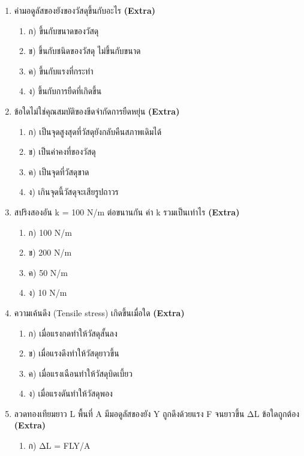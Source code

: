 \documentclass[12pt]{article}
\begin{document}
\begin{enumerate}[label=\arabic*.]
\begin{enumerate}[label=)]
\item ข) 2×10⁵ Pa
\item ค) 2×10⁷ Pa
\item ง) 2×10⁴ Pa
\end{enumerate}
\item ค่ามอดูลัสของยังของวัสดุขึ้นกับอะไร \hfill \textbf{\small (Extra)}
\begin{enumerate}[label=)]
\item ก) ขึ้นกับขนาดของวัสดุ
\item ข) ขึ้นกับชนิดของวัสดุ ไม่ขึ้นกับขนาด
\item ค) ขึ้นกับแรงที่กระทำ
\item ง) ขึ้นกับการยืดที่เกิดขึ้น
\end{enumerate}
\item ข้อใดไม่ใช่คุณสมบัติของขีดจำกัดการยืดหยุ่น \hfill \textbf{\small (Extra)}
\begin{enumerate}[label=)]
\item ก) เป็นจุดสูงสุดที่วัสดุยังกลับคืนสภาพเดิมได้
\item ข) เป็นค่าคงที่ของวัสดุ
\item ค) เป็นจุดที่วัสดุขาด
\item ง) เกินจุดนี้วัสดุจะเสียรูปถาวร
\end{enumerate}
\item สปริงสองอัน k = 100 N/m ต่อขนานกัน ค่า k รวมเป็นเท่าไร \hfill \textbf{\small (Extra)}
\begin{enumerate}[label=)]
\item ก) 100 N/m
\item ข) 200 N/m
\item ค) 50 N/m
\item ง) 10 N/m
\end{enumerate}
\item ความเค้นดึง (Tensile stress) เกิดขึ้นเมื่อใด \hfill \textbf{\small (Extra)}
\begin{enumerate}[label=)]
\item ก) เมื่อแรงกดทำให้วัสดุสั้นลง
\item ข) เมื่อแรงดึงทำให้วัสดุยาวขึ้น
\item ค) เมื่อแรงเฉือนทำให้วัสดุบิดเบี้ยว
\item ง) เมื่อแรงดันทำให้วัสดุพอง
\end{enumerate}
\item ลวดทองเทียมยาว L พื้นที่ A มีมอดูลัสของยัง Y ถูกดึงด้วยแรง F จนยาวขึ้น ΔL ข้อใดถูกต้อง \hfill \textbf{\small (Extra)}
\begin{enumerate}[label=)]
\item ก) ΔL = FLY/A

\end{enumerate}
\end{enumerate}
\end{document}
